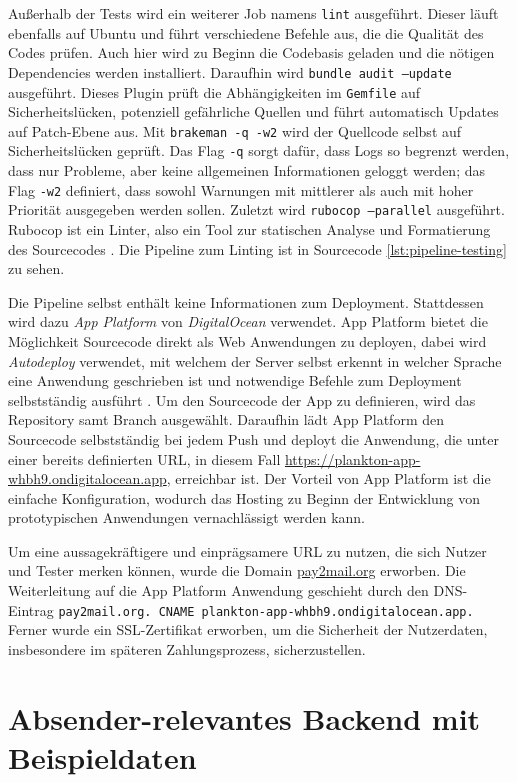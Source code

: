 Außerhalb der Tests wird ein weiterer Job namens \texttt{lint} ausgeführt. Dieser läuft ebenfalls auf Ubuntu und führt verschiedene Befehle aus, die die Qualität des Codes prüfen. Auch hier wird zu Beginn die Codebasis geladen und die nötigen Dependencies werden installiert. Daraufhin wird \texttt{bundle audit --update} ausgeführt. Dieses Plugin prüft die Abhängigkeiten im \texttt{Gemfile} auf Sicherheitslücken, potenziell gefährliche Quellen und führt automatisch Updates auf Patch-Ebene aus. Mit \texttt{brakeman -q -w2} wird der Quellcode selbst auf Sicherheitslücken geprüft. Das Flag \texttt{-q} sorgt dafür, dass Logs so begrenzt werden, dass nur Probleme, aber keine allgemeinen Informationen geloggt werden; das Flag \texttt{-w2} definiert, dass sowohl Warnungen mit mittlerer als auch mit hoher Priorität ausgegeben werden sollen. Zuletzt wird \texttt{rubocop --parallel} ausgeführt. Rubocop ist ein Linter, also ein Tool zur statischen Analyse und Formatierung des Sourcecodes \citep{Batsov2022}. Die Pipeline zum Linting ist in Sourcecode \ref{lst:pipeline-testing} zu sehen.

Die Pipeline selbst enthält keine Informationen zum Deployment. Stattdessen wird dazu \textit{App Platform} von \textit{DigitalOcean} verwendet. App Platform bietet die Möglichkeit Sourcecode direkt als Web Anwendungen zu deployen, dabei wird \textit{Autodeploy} verwendet, mit welchem der Server selbst erkennt in welcher Sprache eine Anwendung geschrieben ist und notwendige Befehle zum Deployment selbstständig ausführt \citep{DigitalOcean2022}. Um den Sourcecode der App zu definieren, wird das Repository samt Branch ausgewählt. Daraufhin lädt App Platform den Sourcecode selbstständig bei jedem Push und deployt die Anwendung, die unter einer bereits definierten URL, in diesem Fall \url{https://plankton-app-whbh9.ondigitalocean.app}, erreichbar ist. Der Vorteil von App Platform ist die einfache Konfiguration, wodurch das Hosting zu Beginn der Entwicklung von prototypischen Anwendungen vernachlässigt werden kann.

Um eine aussagekräftigere und einprägsamere URL zu nutzen, die sich Nutzer und Tester merken können, wurde die Domain \url{pay2mail.org} erworben. Die Weiterleitung auf die App Platform Anwendung geschieht durch den DNS-Eintrag \texttt{pay2mail.org. CNAME plankton-app-whbh9.ondigitalocean.app.} Ferner wurde ein SSL-Zertifikat erworben, um die Sicherheit der Nutzerdaten, insbesondere im späteren Zahlungsprozess, sicherzustellen.

\section{Absender-relevantes Backend mit Beispieldaten}
\label{Absender-relevantes_Backend_mit_Beispieldaten}

